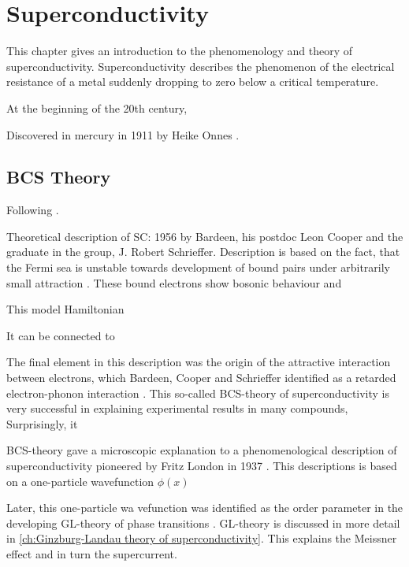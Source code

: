 \documentclass[../main.tex]{subfiles}
\begin{document}
\chapter{Superconductivity}

This chapter gives an introduction to the phenomenology and theory of superconductivity.
Superconductivity describes the phenomenon of the electrical resistance of a metal suddenly dropping to zero below a critical temperature.

At the beginning of the 20th century, 


Discovered in mercury in 1911 by Heike Onnes \cite{onnes1911further}.



\section{BCS Theory}

Following \cite[ch. 14]{colemanIntroductionManyBodyPhysics2015}.

Theoretical description of SC: 1956 by Bardeen, his postdoc Leon Cooper and the graduate in the group, J. Robert Schrieffer.
Description is based on the fact, that the Fermi sea is unstable towards development of bound pairs under arbitrarily small attraction \cite{cooperBoundElectronPairs1956}.
These bound electrons show bosonic behaviour and 

This model Hamiltonian

It can be connected to 

The final element in this description was the origin of the attractive interaction between electrons, which Bardeen, Cooper and Schrieffer identified as a retarded electron-phonon interaction \cite{bardeenTheorySuperconductivity1957}.
This so-called BCS-theory of superconductivity is very successful in explaining experimental results in many compounds, 
Surprisingly, it

BCS-theory gave a microscopic explanation to a phenomenological description of superconductivity pioneered by Fritz London in 1937 \cite{londonNewConceptionSupraconductivity1937}.
This descriptions is based on a one-particle wavefunction \(\phi (x)\)

Later, this one-particle wa
vefunction was identified as the order parameter in the developing GL-theory of phase transitions \cite{terhaar73THEORYSUPERCONDUCTIVITY1965}.
GL-theory is discussed in more detail in \cref{ch:Ginzburg-Landau theory of superconductivity}.
This explains the Meissner effect and in turn the supercurrent.

\end{document}
